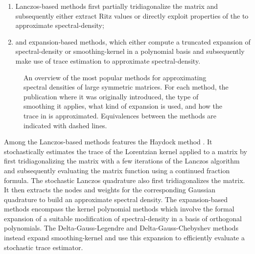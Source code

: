 \begin{enumerate}
    \item Lanczos-based methods first partially tridiagonalize the matrix and
    subsequently either extract Ritz values or directly exploit properties of the
     to approximate \gls{spectral-density};
    \item and expansion-based methods, which either compute a truncated expansion of
    \gls{spectral-density} or \gls{smoothing-kernel} in a polynomial basis and subsequently
    make use of trace estimation to approximate \gls{spectral-density}.
\end{enumerate}

\begin{figure}[ht]
    \centering
    
    \caption{An overview of the most popular methods for approximating
        spectral densities of large symmetric matrices. For each method, the publication
        where it was originally introduced, the type of smoothing it applies,
        what kind of expansion is used, and how the trace in
         is approximated.
        Equivalences between the methods are indicated with dashed lines.}
    \label{fig:1-introduction-literature-overview}
\end{figure}

Among the Lanczos-based methods features the Haydock method \cite{haydock1972electronic, lin2016review}.
It stochastically estimates the trace of the Lorentzian kernel applied to a matrix
by first tridiagonalizing the matrix with a few iterations of the Lanczos algorithm
\cite{lanczos1950iteration} and subsequently evaluating the matrix function using
a continued fraction formula. The stochastic Lanczos quadrature \cite{lin2016review, ubaru2017lanczos,chen2021slq}
also first tridiagonalizes the matrix. It then extracts the nodes and weights
for the corresponding Gaussian quadrature to build an approximate spectral density.
The expansion-based methods encompass the kernel polynomial methods \cite{silver1994kpm, wang1994kpm, weisse2006kpm}
which involve the formal expansion of a suitable modification of \gls{spectral-density}
in a basis of orthogonal polynomials. The Delta-Gauss-Legendre \cite{lin2016review}
and Delta-Gauss-Chebyshev \cite{lin2017randomized} methods instead expand \gls{smoothing-kernel}
and use this expansion to efficiently evaluate a stochastic trace estimator.\\

